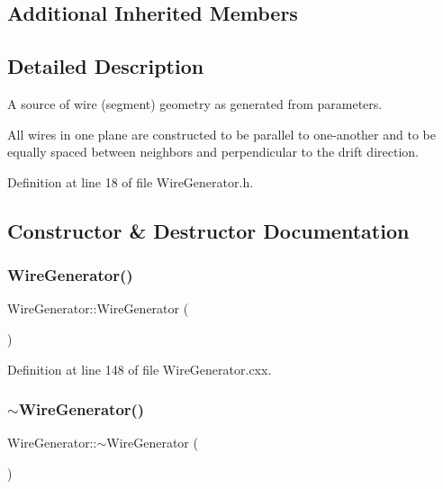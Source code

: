 \subsection*{Additional Inherited Members}


\subsection{Detailed Description}
A source of wire (segment) geometry as generated from parameters.

All wires in one plane are constructed to be parallel to one-\/another and to be equally spaced between neighbors and perpendicular to the drift direction. 

Definition at line 18 of file Wire\+Generator.\+h.



\subsection{Constructor \& Destructor Documentation}
\mbox{\label{class_wire_cell_1_1_wire_generator_a935d3aa39c564e878d6011de6f4cfd42}} 
\subsubsection{\texorpdfstring{Wire\+Generator()}{WireGenerator()}}
{\footnotesize\ttfamily Wire\+Generator\+::\+Wire\+Generator (\begin{DoxyParamCaption}{ }\end{DoxyParamCaption})}



Definition at line 148 of file Wire\+Generator.\+cxx.

\mbox{\label{class_wire_cell_1_1_wire_generator_a907e310d6f77cf3a9da23cbc39a4d40f}} 
\subsubsection{\texorpdfstring{$\sim$\+Wire\+Generator()}{~WireGenerator()}}
{\footnotesize\ttfamily Wire\+Generator\+::$\sim$\+Wire\+Generator (\begin{DoxyParamCaption}{ }\end{DoxyParamCaption})\hspace{0.3cm}{\ttfamily [virtual]}}



